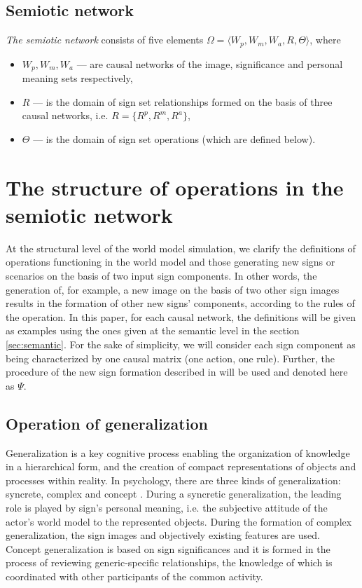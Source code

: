 \documentclass[review]{elsarticle}
\begin{document}
\subsection{Semiotic network}
\textit{The semiotic network} consists of five elements $\Omega=\langle W_p, W_m, W_a, R, \Theta \rangle$, where
\begin{itemize}
	\item $W_p, W_m, W_a$ --- are causal networks of the image, significance and personal meaning sets respectively,
	\item $R$ --- is the domain of sign set relationships formed on the basis of three causal networks, i.e.  $R=\{R^p, R^m, R^a\}$,
	\item $\Theta$ --- is the domain of sign set operations (which are defined below).
\end{itemize} 


\section{The structure of operations in the semiotic network }\label{sec:operations}
At the structural level of the world model simulation, we clarify the definitions of operations functioning in the world model and those generating new signs or scenarios on the basis of two input sign components. In other words, the generation of, for example, a new image on the basis of two other sign images results in the formation of other new signs' components, according to the rules of the operation. In this paper, for each causal network, the definitions will be given as examples using the ones given at the semantic level in the section \ref{sec:semantic}. For the sake of simplicity, we will consider each sign component as being characterized by one causal matrix (one action, one rule). Further, the procedure of the new sign formation described in \cite{Osipov2014c} will be used and denoted here as $\Psi$.

\subsection{Operation of generalization}
Generalization is a key cognitive process enabling the organization of knowledge in a hierarchical form, and the creation of compact representations of objects and processes within reality. In psychology, there are three kinds of generalization: syncrete, complex and concept \cite{Vygotsky1999}. During a syncretic generalization, the leading role is played by sign's personal meaning, i.e. the subjective attitude of the actor's world model to the represented objects. During the formation of complex generalization, the sign images and objectively existing features are used. Concept generalization is based on sign significances and it is formed in the process of reviewing generic-specific relationships, the knowledge of which is coordinated with other participants of the common activity.
\end{document}
